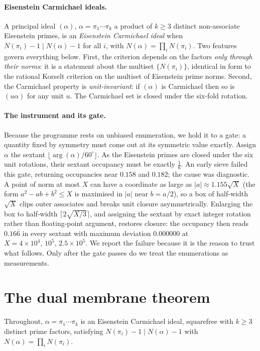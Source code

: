 \documentclass[11pt]{article}
\begin{document}
\paragraph{Eisenstein Carmichael ideals.}
A principal ideal $(\alpha)$, $\alpha=\pi_1\cdots\pi_k$ a product of $k\ge3$ distinct non-associate
Eisenstein primes, is an \emph{Eisenstein Carmichael ideal} when $N(\pi_i)-1\mid N(\alpha)-1$ for all
$i$, with $N(\alpha)=\prod_iN(\pi_i)$. Two features govern everything below. First, the criterion
depends on the factors \emph{only through their norms}: it is a statement about the multiset
$\{N(\pi_i)\}$, identical in form to the rational Korselt criterion on the multiset of Eisenstein prime
norms. Second, the Carmichael property is \emph{unit-invariant}: if $(\alpha)$ is Carmichael then so is
$(u\alpha)$ for any unit $u$. The Carmichael set is closed under the six-fold rotation.

\paragraph{The instrument and its gate.}
Because the programme rests on unbiased enumeration, we hold it to a gate: a quantity fixed by symmetry
must come out at its symmetric value exactly. Assign $\alpha$ the sextant
$\lfloor\arg(\alpha)/60^\circ\rfloor$. As the Eisenstein primes are closed under the six unit
rotations, their sextant occupancy must be exactly $\tfrac16$. An early sieve failed this gate,
returning occupancies near $0.158$ and $0.182$; the cause was diagnostic. A point of norm at most $X$
can have a coordinate as large as $|a|\approx1.155\sqrt X$ (the form $a^2-ab+b^2\le X$ is maximised in
$|a|$ near $b=a/2$), so a box of half-width $\sqrt X$ clips outer associates and breaks unit closure
asymmetrically. Enlarging the box to half-width $\lceil2\sqrt{X/3}\rceil$, and assigning the sextant by
exact integer rotation rather than floating-point argument, restores closure: the occupancy then reads
$0.16\overline{6}$ in every sextant with maximum deviation $0.000000$ at $X=4\times10^4,\,10^5,\,
2.5\times10^5$. We report the failure because it is the reason to trust what follows. Only after the
gate passes do we treat the enumerations as measurements.

\section{The dual membrane theorem}\label{sec:mem}
Throughout, $\alpha=\pi_1\cdots\pi_k$ is an Eisenstein Carmichael ideal, squarefree with $k\ge3$
distinct prime factors, satisfying $N(\pi_i)-1\mid N(\alpha)-1$ with $N(\alpha)=\prod_iN(\pi_i)$.
\end{document}
